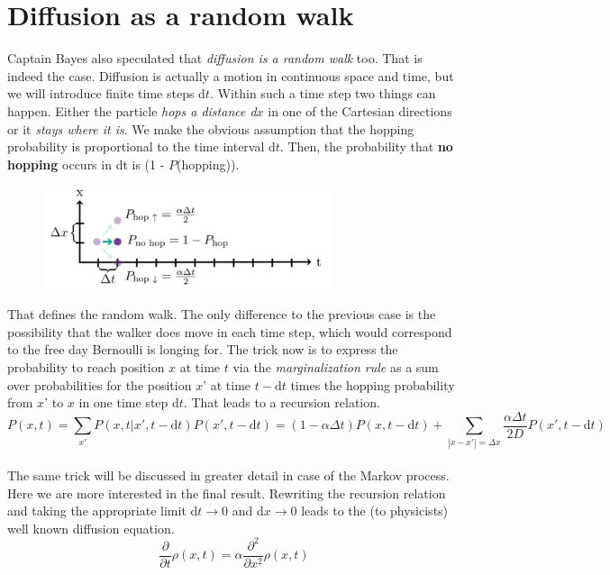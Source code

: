 \documentclass[12pt, a4paper]{scrartcl}
\begin{document}
\section*{Diffusion as a random walk}
Captain Bayes also speculated that \textit{diffusion is a random walk} too. That is indeed the case.
Diffusion is actually a motion in continuous space and time, but we will introduce finite time steps d$t$. Within such a time step two things can happen. Either the particle \textit{hops a distance d$x$} in one of the Cartesian directions or it \textit{stays where it is}. We make the obvious assumption that the hopping probability is proportional to the time interval d$t$.
Then, the probability that \textbf{no hopping} occurs in dt is (1 - $P$(hopping)). %
 \begin{figure}[H]
	\centering
	\includegraphics[width=0.75\textwidth]{5_3.png}
\end{figure}
That defines the random walk. The only difference to the previous case is the possibility that the walker does  move in each time step, which would correspond to the free day Bernoulli is longing for.
The trick now is to express the probability to reach position $x$ at time $t$ via the \textit{marginalization rule} as a sum over probabilities for the position $x’$ at time $t-\text{d}t$ times the hopping probability from $x’$ to $x$ in one time step d$t$. That leads to a recursion relation. 
\begin{equation*}\boxed{P(x,t)=\sum_{x'}P(x,t|x',t-\text{d}t)P(x',t-\text{d}t)=(1-\alpha\Delta t)P(x,t-\text{d}t)+\sum_{|x-x'|=\Delta x}\frac{\alpha\Delta t}{2D}P(x',t-\text{d}t)
}\end{equation*}\\
The same trick will be discussed in greater detail in case of the Markov process. Here we are more interested in the final result.
Rewriting the recursion relation and taking the appropriate limit d$t\rightarrow 0$ and d$x \rightarrow 0$ leads to the (to physicists) well known diffusion equation.
\begin{equation*}\boxed{\frac{\partial}{\partial t}\rho(x,t)=\alpha \frac{\partial^2}{\partial x^2}\rho(x,t)
}\end{equation*}\\
\end{document}

